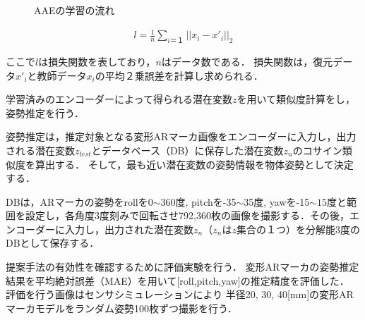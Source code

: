 \documentclass{jsarticle}
\begin{document}
\begin{figure}[ht]
\vspace{0zh}
\setlength{\epsfxsize}{7.5cm}
\centerline{}
\vspace{0zh}
\caption{AAEの学習の流れ}
\label{BB}
\vspace{-1zh}
\end{figure}




\begin{eqnarray}
\label{sonsitu}
l=\frac{1}{n}\sum_{i＝１} ||x_i-x'_i||_2
\end{eqnarray}

ここで$l$は損失関数を表しており，$n$はデータ数である．
損失関数は，復元データ$x'_i$と教師データ$x_i$の平均２乗誤差を計算し求められる．








学習済みのエンコーダーによって得られる潜在変数$z$を用いて類似度計算をし，姿勢推定を行う．


姿勢推定は，推定対象となる変形ARマーカ画像をエンコーダーに入力し，出力される潜在変数$z_{test}$とデータベース（DB）に保存した潜在変数$z_n$のコサイン類似度を算出する．
そして，最も近い潜在変数の姿勢情報を物体姿勢として決定する．

DBは，ARマーカの姿勢をrollを0$\sim$360度, pitchを-35$\sim$35度, yawを-15$\sim15$度と範囲を設定し，各角度3度刻みで回転させ792,360枚の画像を撮影する．その後，エンコーダーに入力し，出力された潜在変数$z_n$（$z_n$は$z$集合の１つ）を分解能3度のDBとして保存する．










提案手法の有効性を確認するために評価実験を行う．
変形ARマーカの姿勢推定結果を平均絶対誤差（MAE）を用いて[roll,pitch,yaw]の推定精度を評価した．
評価を行う画像はセンサシミュレーションにより
半径20, 30, 40[mm]の変形ARマーカモデルをランダム姿勢100枚ずつ撮影を行う．
\end{document}
